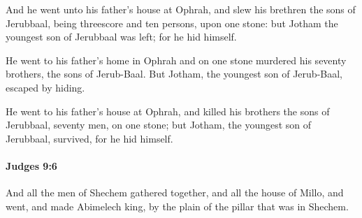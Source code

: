			\begin{versebox}
					\item[BHS] 
					\item[ASV] And he went unto his father's house at Ophrah, and slew his brethren the sons of Jerubbaal, being threescore and ten persons, upon one stone: but Jotham the youngest son of Jerubbaal was left; for he hid himself.
					\item[NIV] He went to his father’s home in Ophrah and on one stone murdered his seventy brothers, the sons of Jerub-Baal. But Jotham, the youngest son of Jerub-Baal, escaped by hiding.
					\item[NRSV] He went to his father’s house at Ophrah, and killed his brothers the sons of Jerubbaal, seventy men, on one stone; but Jotham, the youngest son of Jerubbaal, survived, for he hid himself.
			\end{versebox}

		\paragraph{Judges 9:6} %
			\label{JUDGES-9-6}

			And all the men of Shechem gathered together, and all the house of Millo, and went, and made Abimelech king, by the plain of the pillar that was in Shechem.

